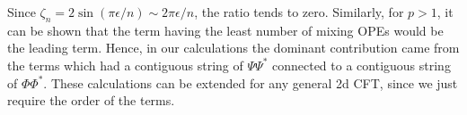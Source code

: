 \documentclass[11pt]{article}
\newcommand{\ep}{\epsilon}
\newcommand{\mO}{\mathcal{O}}
\newcommand{\nn}{\nonumber}
\newcommand{\lb}{\left(}
\newcommand{\rb}{\right)}
\begin{document}
Since $\zeta_n = 2\sin(\pi \ep/n) \sim 2\pi \ep/n$, the ratio tends to zero.  
Similarly, for  $p>1$, it can be shown that the term having the least number of mixing OPEs would be the leading term. Hence, in our calculations the dominant contribution came from the terms which had a contiguous string of $\Psi \Psi^*$ connected to a contiguous string of $\Phi \Phi^*$. These calculations can be extended for any general 2d CFT, since we just require the order of the terms. 


 


\end{document}

